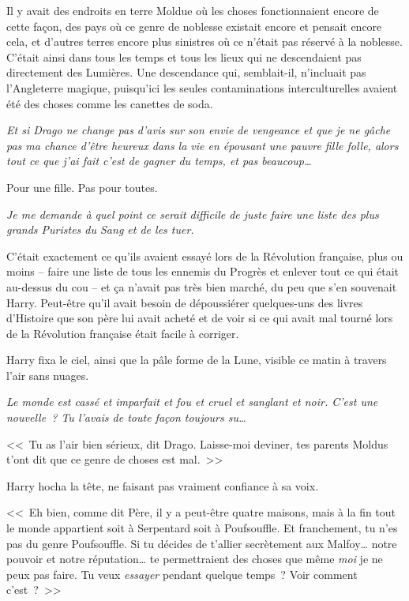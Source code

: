 Il y avait des endroits en terre Moldue où les choses fonctionnaient encore de cette façon, des pays où ce genre de noblesse existait encore et pensait encore cela, et d'autres terres encore plus sinistres où ce n'était pas réservé à la noblesse. C'était ainsi dans tous les temps et tous les lieux qui ne descendaient pas directement des Lumières. Une descendance qui, semblait-il, n'incluait pas l'Angleterre magique, puisqu'ici les seules contaminations interculturelles avaient été des choses comme les canettes de soda.

\emph{Et si Drago ne change pas d'avis sur son envie de vengeance et que je ne gâche pas ma chance d'être heureux dans la vie en épousant une pauvre fille folle, alors tout ce que j'ai fait c'est de gagner du temps, et pas beaucoup…}

Pour une fille. Pas pour toutes.

\emph{Je me demande à quel point ce serait difficile de juste faire une liste des plus grands Puristes du Sang et de les tuer.}

C'était exactement ce qu'ils avaient essayé lors de la Révolution française, plus ou moins -- faire une liste de tous les ennemis du Progrès et enlever tout ce qui était au-dessus du cou -- et ça n'avait pas très bien marché, du peu que s'en souvenait Harry. Peut-être qu'il avait besoin de dépoussiérer quelques-uns des livres d'Histoire que son père lui avait acheté et de voir si ce qui avait mal tourné lors de la Révolution française était facile à corriger.

Harry fixa le ciel, ainsi que la pâle forme de la Lune, visible ce matin à travers l'air sans nuages.

\emph{Le monde est cassé et imparfait et fou et cruel et sanglant et noir. C'est une nouvelle~? Tu l'avais de toute façon toujours su…}

<<~Tu as l'air bien sérieux, dit Drago. Laisse-moi deviner, tes parents Moldus t'ont dit que ce genre de choses est mal.~>>

Harry hocha la tête, ne faisant pas vraiment confiance à sa voix.

<<~Eh bien, comme dit Père, il y a peut-être quatre maisons, mais à la fin tout le monde appartient soit à Serpentard soit à Poufsouffle. Et franchement, tu n'es pas du genre Poufsouffle. Si tu décides de t'allier secrètement aux Malfoy… notre pouvoir et notre réputation… te permettraient des choses que même \emph{moi} je ne peux pas faire. Tu veux \emph{essayer} pendant quelque temps~? Voir comment c'est~?~>>

